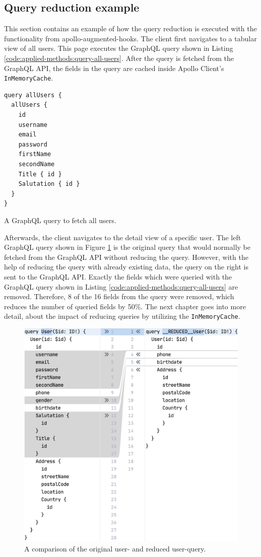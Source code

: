 \subsection{Query reduction example}\label{subsection:background:graphql:example-reduction}

This section contains an example of how the query reduction is executed with the functionality from apollo-augmented-hooks. The client first navigates to a tabular view of all users. This page executes the GraphQL query shown in Listing \ref{code:applied-methods:query-all-users}. After the query is fetched from the GraphQL \ac{API}, the fields in the query are cached inside Apollo Client's \texttt{InMemoryCache}.

\ifshowListings
\begin{listing}[H]
\begin{verbatim}
query allUsers {
  allUsers {
    id
    username
    email
    password
    firstName
    secondName
    Title { id }
    Salutation { id }
  }
}
\end{verbatim}
\caption{A GraphQL query to fetch all users.}\label{code:applied-methods:query-all-users}
\end{listing}
\fi

\noindent Afterwards, the client navigates to the detail view of a specific user. The left GraphQL query shown in Figure \ref{fig:applied-methods:comparison-user-reduced-user} is the original query that would normally be fetched from the GraphQL \ac{API} without reducing the query. However, with the help of reducing the query with already existing data, the query on the right is sent to the GraphQL \ac{API}. Exactly the fields which were queried with the GraphQL query shown in Listing \ref{code:applied-methods:query-all-users} are removed. Therefore, 8 of the 16 fields from the query were removed, which reduces the number of queried fields by 50\%. The next chapter goes into more detail, about the impact of reducing queries by utilizing the \texttt{InMemoryCache}.

\ifshowImages
  \begin{figure}[H]
  \centering
  \includegraphics[width=0.65\linewidth]{images/reduction-graphql-examples/compare-user-reduced-user.png}
  \caption{A comparison of the original user- and reduced user-query.}\label{fig:applied-methods:comparison-user-reduced-user}
  \end{figure}
\fi
